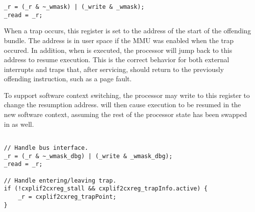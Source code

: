 \declaration{}
\implementation{}
\begin{lstlisting}
_r = (_r & ~_wmask) | (_write & _wmask);
_read = _r;
\end{lstlisting}




When a trap occurs, this register is set to the address of the start of the
offending bundle. The address is in user space if the MMU was enabled when the
trap occured. In addition, when  is executed, the processor will jump
back to this address to resume execution. This is the correct behavior for both
external interrupts and traps that, after servicing, should return to the
previously offending instruction, such as a page fault.

To support software context switching, the processor may write to this register
to change the resumption address.  will then cause execution to be
resumed in the new software context, assuming the rest of the processor state
has been swapped in as well.

\declaration{}
\implementation{}
\begin{lstlisting}

// Handle bus interface.
_r = (_r & ~_wmask_dbg) | (_write & _wmask_dbg);
_read = _r;

// Handle entering/leaving trap.
if (!cxplif2cxreg_stall && cxplif2cxreg_trapInfo.active) {
    _r = cxplif2cxreg_trapPoint;
}

\end{lstlisting}


